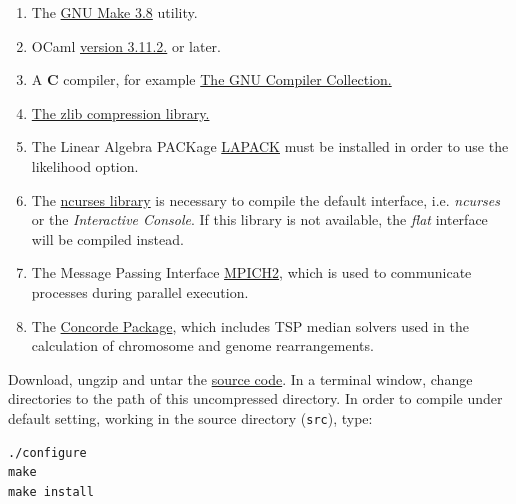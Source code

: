 \begin{enumerate}
\item The \href{http://www.gnu.org/software/make/}{GNU Make 3.8} utility. 
\item OCaml \href{http://www.ocaml.org}{version 3.11.2.} or later. 
\item A {\bf C} compiler, for example \href{http://gcc.gnu.org/} 
{The GNU Compiler Collection.}
\item \href{http://www.zlib.net}{The zlib compression library.}
\item The Linear Algebra PACKage \href {http://www.netlib.org/lapack/}
{LAPACK} must be installed in order to use the likelihood option.
\item The \href{http://www.gnu.org/s/ncurses} {ncurses library} 
is necessary to compile the default interface, i.e. \emph{ncurses} 
or the \emph{Interactive Console}. If this library is not available, 
the \emph{flat} interface will be compiled instead.
\item The Message Passing Interface \href{http://www-unix.mcs.anl.gov/mpi/}
{MPICH2}, which is used to communicate processes during parallel execution.
\item The \href{http://www.tsp.gatech.edu/concorde/}{Concorde Package}, 
which includes TSP median solvers used in the calculation of 
chromosome and genome rearrangements. 
\end{enumerate}
Download, ungzip and untar the
\href{http://www.amnh.org/our-research/computational-sciences/research/projects/systematic-biology/poy/download}
{\poy source code}.  In a terminal window, change directories to the path of this 
uncompressed directory. In order to compile under default setting, 
working in the source directory (\texttt{src}), type:

\begin{verbatim}
./configure
make
make install
\end{verbatim}

